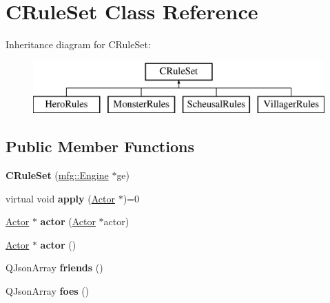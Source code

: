 \hypertarget{class_c_rule_set}{}\section{C\+Rule\+Set Class Reference}
\label{class_c_rule_set}
Inheritance diagram for C\+Rule\+Set\+:\begin{figure}[H]
\begin{center}
\leavevmode
\includegraphics[height=2.000000cm]{class_c_rule_set}
\end{center}
\end{figure}
\subsection*{Public Member Functions}
\begin{DoxyCompactItemize}
\item 
\mbox{\label{class_c_rule_set_a703efd57849cd1df8ba1320b2d829625}} 
{\bfseries C\+Rule\+Set} (\hyperlink{classmfg_1_1_engine}{mfg\+::\+Engine} $\ast$ge)
\item 
\mbox{\label{class_c_rule_set_ab5c98035511b5cd85917a65872b2e6ee}} 
virtual void {\bfseries apply} (\hyperlink{class_actor}{Actor} $\ast$)=0
\item 
\mbox{\label{class_c_rule_set_a37578f0ffacd07b427afb81485be909f}} 
\hyperlink{class_actor}{Actor} $\ast$ {\bfseries actor} (\hyperlink{class_actor}{Actor} $\ast$actor)
\item 
\mbox{\label{class_c_rule_set_a7fc1f3a23e0e099a3677ae6b53aa2f93}} 
\hyperlink{class_actor}{Actor} $\ast$ {\bfseries actor} ()
\item 
\mbox{\label{class_c_rule_set_a2fd71397c539782f8dd431859899f086}} 
Q\+Json\+Array {\bfseries friends} ()
\item 
\mbox{\label{class_c_rule_set_a3e2083c36810dbff8d1907662a49631f}} 
Q\+Json\+Array {\bfseries foes} ()
\end{DoxyCompactItemize}
